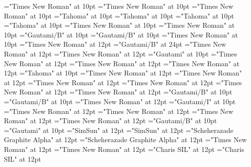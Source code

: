 \documentclass[a4paper]{article}
\begin{document}
\font\sensesensesentryletDatadicBody="Times New Roman" at 10pt
\font\sensesafterentryletDatadicBody="Times New Roman" at 10pt
\font\sensesentryletDatadicBody="Times New Roman" at 10pt
\font\spanggofonipaxemicpronunciationpronunciationsentryletDatadicBody="Tahoma" at 10pt
\font\pronunciationafterpronunciationsentryletDatadicBody="Tahoma" at 10pt
\font\pronunciationbeforepronunciationsentryletDatadicBody="Tahoma" at 10pt
\font\pronunciationpronunciationsentryletDatadicBody="Tahoma" at 10pt
\font\pronunciationsafterentryletDatadicBody="Times New Roman" at 10pt
\font\pronunciationsentryletDatadicBody="Times New Roman" at 10pt
\font\headwordafterentryletDatadicBody="Gautami/B" at 10pt
\font\headwordentryletDatadicBody="Gautami/B" at 10pt
\font\entryletDatadicBody="Times New Roman" at 10pt
\font{}="Times New Roman" at 12pt
\font{}="Gautami/B" at 24pt
\font{}="Times New Roman" at 12pt
\font\xitemtpi="Times New Roman" at 12pt
\font\xitemxitemtranslationLdbefore="Gautami" at 10pt
\font\xitemxitemtranslationbefore="Times New Roman" at 12pt
\font\sensesensesensesbefore="Times New Roman" at 12pt
\font\xitemxitempronunciationsbefore="Times New Roman" at 12pt
\font\xitemxitempronunciationbefore="Tahoma" at 10pt
\font\xitemxitemprimaryrefsbefore="Times New Roman" at 12pt
\font\xitemxitempictureLabelbefore="Times New Roman" at 12pt
\font\xitemxitempartofspeechbefore="Times New Roman" at 12pt
\font\xitemxitemLexSensepublishStemGlossPubbefore="Times New Roman" at 12pt
\font\xitemxitemLexEntryTypepublishStemEntryTypeAbbreviationPubbefore="Times New Roman" at 12pt
\font\xitemxitemLexEntryTypepublishStemComplexFormTypeReverseAbbrPubbefore="Times New Roman" at 12pt
\font\xitemxitemLexEntrypublishStemComponentTargetHeadWordRefbefore="Gautami/B" at 10pt
\font\xitemxitemheadwordbefore="Gautami/B" at 10pt
\font\xitemxitemexamplesbefore="Times New Roman" at 12pt
\font\xitemxitemexamplebefore="Gautami/I" at 10pt
\font\xitemxitementryreftypebefore="Times New Roman" at 12pt
\font\xitemxitementryrefcomponentbefore="Times New Roman" at 12pt
\font\xitemxitemdefinitionbefore="Times New Roman" at 12pt
\font\xitemxitemcomplexformrefsbefore="Times New Roman" at 12pt
\font\xitemxitemcomplexformformbefore="Gautami/B" at 10pt
\font\xitemte="Gautami" at 10pt
\font\spanzhCN="SimSun" at 12pt
\font\divzhCN="SimSun" at 12pt
\font\spanur="Scheherazade Graphite Alpha" at 12pt
\font\divur="Scheherazade Graphite Alpha" at 12pt
\font\spanurxind="Times New Roman" at 12pt
\font\divurxind="Times New Roman" at 12pt
\font\spantr="Charis SIL" at 12pt
\font\divtr="Charis SIL" at 12pt
\end{document}
